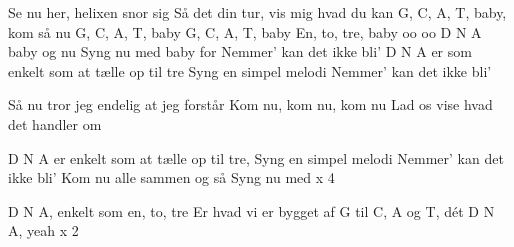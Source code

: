\documentclass[a4paper,11pt]{article}
\begin{document}
\begin{song}
  Se nu her, helixen snor sig
	Så det din tur, vis mig hvad du kan
	G, C, A, T, baby, kom så nu
 G, C, A, T, baby
 G, C, A, T, baby 
 En, to, tre, baby oo oo
	D N A baby og nu
	Syng nu med baby for
Nemmer’ kan det ikke bli’
	D N A er som enkelt som at tælle op til tre
	Syng en simpel melodi
	Nemmer’ kan det ikke bli’

Så nu tror jeg endelig at jeg forstår
	Kom nu, kom nu, kom nu
	Lad os vise hvad det handler om

	D N A er enkelt som at tælle op til tre,
	Syng en simpel melodi
	Nemmer’ kan det ikke bli’
	Kom nu alle sammen og så
	Syng nu med x 4

 D N A, enkelt som en, to, tre
Er hvad vi er bygget af
G til C, A og T, dét D N A, yeah x 2 


\end{song}
\end{document}
